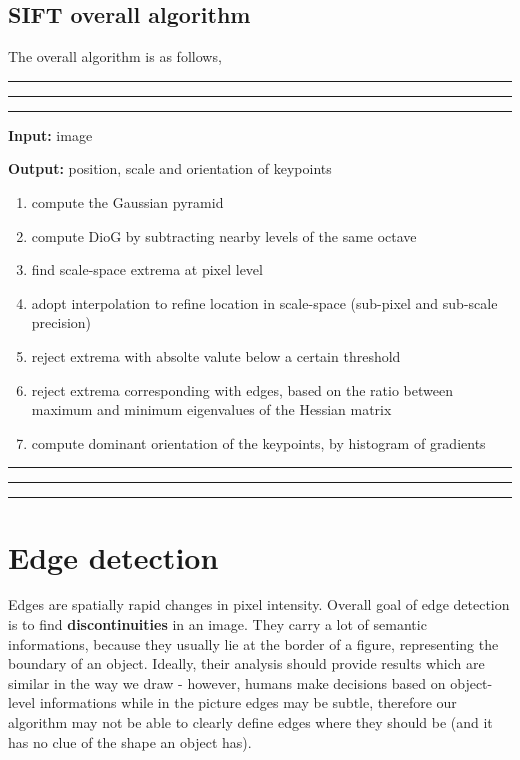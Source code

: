 \documentclass[10pt]{report}
\begin{document}
\subsection{SIFT overall algorithm}
\label{sift-overall-algorithm}
The overall algorithm is as follows,

\vspace*{0.6cm}\hrule
\hrule
\hrule
\vspace*{0.4cm}

\textbf{Input:} image

\textbf{Output:} position, scale and orientation of keypoints

\begin{enumerate}
\item compute the Gaussian pyramid
\item compute DioG by subtracting nearby levels of the same octave
\item find scale-space extrema at pixel level
\item adopt interpolation to refine location in scale-space (sub-pixel and
sub-scale precision)
\item reject extrema with absolte valute below a certain threshold
\item reject extrema corresponding with edges, based on the ratio between
maximum and minimum eigenvalues of the Hessian matrix
\item compute dominant orientation of the keypoints, by histogram of
gradients
\end{enumerate}

\vspace*{0.6cm}\hrule
\hrule
\hrule
\vspace*{0.4cm}

\section{Edge detection}
\label{edge-detection}
Edges are spatially rapid changes in pixel intensity. Overall goal of
edge detection is to find \textbf{discontinuities} in an image. They carry a
lot of semantic informations, because they usually lie at the border of
a figure, representing the boundary of an object. Ideally, their
analysis should provide results which are similar in the way we draw -
however, humans make decisions based on object-level informations while
in the picture edges may be subtle, therefore our algorithm may not be
able to clearly define edges where they should be (and it has no clue of
the shape an object has).
\end{document}
